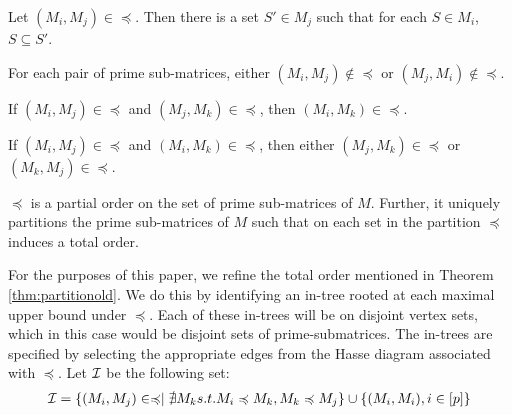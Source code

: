 \begin{lemma} \label{lem:containment} Let $(M_i,M_j) \in
  \preccurlyeq$.  Then there is a set $S' \in M_j$ such that for each
  $S \in M_i$, $S \subseteq S'$.
\end{lemma}
\begin{lemma}
  For each pair of prime sub-matrices, either $(M_i,M_j) \not\in
  \preccurlyeq$ or $(M_j,M_i) \not\in \preccurlyeq$.
\end{lemma}
\begin{lemma}
  If $(M_i,M_j) \in \preccurlyeq $ and $(M_j,M_k) \in \preccurlyeq$,
  then $(M_i,M_k) \in \preccurlyeq$.
\end{lemma}
\begin{lemma}
  If $(M_i,M_j) \in \preccurlyeq$ and $(M_i,M_k) \in \preccurlyeq$,
  then either $(M_j,M_k) \in \preccurlyeq$ or $(M_k,M_j) \in
  \preccurlyeq$.
\end{lemma}
\begin{theorem} \label{thm:partitionold} $\preccurlyeq$ is a partial
  order on the set of prime sub-matrices of $M$.  Further, it uniquely
  partitions the prime sub-matrices of $M$ such that on each set in
  the partition $\preccurlyeq$ induces a total order.
\end{theorem}
For the purposes of this paper, we refine the total order mentioned in
Theorem \ref{thm:partitionold}. We do this by identifying an in-tree
rooted at each maximal upper bound under $\preccurlyeq$.  Each of
these in-trees will be on disjoint vertex sets, which in this case
would be disjoint sets of prime-submatrices.  The in-trees are
specified by selecting the appropriate edges from the Hasse diagram
associated with $\preccurlyeq$.  Let ${\cal I}$ be the following set:
\begin{align*}
  {\cal I} = \{ (M_i,M_j) \in \preccurlyeq \mid \nexists M_k s.t. M_i
  \preccurlyeq M_k, M_k \preccurlyeq M_j \} \cup \{ (M_i,M_i), i \in
  [p] \}
\end{align*}

